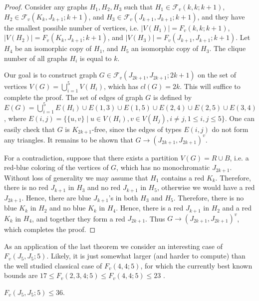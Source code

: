 \begin{proof}
Consider any graphs $H_1, H_2, H_3$ such that
$H_1 \in \mathcal{F}_v(k,k;k+1)$,
$H_2 \in \mathcal{F}_v(K_k,J_{k+1};k+1)$, and
$H_3 \in \mathcal{F}_v(J_{k+1},J_{k+1};k+1)$,
and they have the smallest possible number of vertices,
i.e. $|V(H_1)| = F_v(k,k;k+1)$,
$|V(H_2)| = F_v(K_k,J_{k+1};k+1)$, and
$|V(H_3)| = F_v(J_{k+1},J_{k+1};k+1)$.
Let $H_4$ be an isomorphic copy of $H_1$,
and $H_5$ an isomorphic copy of $H_3$.
The clique number of all graphs $H_i$ is
equal to $k$.

Our goal is to construct graph
$G \in \mathcal{F}_v(J_{2k+1},J_{2k+1};2k+1)$
on the set of vertices
$V(G)=\bigcup_{i=1}^5 V(H_i)$,
which has $cl(G)=2k$.
This will suffice to complete the proof.
The set of edges of graph $G$ is defined by
$E(G) = \bigcup_{i=1} ^5 E(H_i) \cup E(1,3)
\cup E(1,5) \cup E(2,4) \cup E(2,5) \cup E(3,4)$,
where
$E(i,j) = \{ \{ u,v\} \;|\; u \in V(H_i), v \in V(H_j),
i \not= j, 1 \le i,j \le 5\}$.
One can easily check that $G$ is $K_{2k+1}$-free,
since the edges of types $E(i,j)$ do not form
any triangles. It remains to be shown that
$G \rightarrow (J_{2k+1},J_{2k+1})^v$.

For a contradiction, suppose that there exists a partition
$V(G)=R \cup B$, i.e. a red-blue coloring of the vertices
of $G$, which has no monochromatic $J_{2k+1}$.
Without loss of generality we may assume that
$H_1$ contains a red $K_k$. Therefore, there is no red
$J_{k+1}$ in $H_3$ and no red $J_{k+1}$ in $H_5$,
otherwise we would have a red $J_{2k+1}$.
Hence, there are blue $J_{k+1}$'s in both
$H_3$ and $H_5$.
Therefore, there is no blue $K_k$ in $H_2$
and no blue $K_k$ in $H_4$.
Hence, there is a red $J_{k+1}$ in $H_2$
and a red $K_k$ in $H_4$, and together
they form a red $J_{2k+1}$.
Thus $G \rightarrow (J_{2k+1},J_{2k+1})^v$,
which completes the proof.
\end{proof}

\smallskip
As an application of the last theorem
we consider an interesting case of $F_v(J_5,J_5;5)$.
Likely, it is just somewhat larger (and harder to compute)
than the well studied classical case of
$F_v(4,4;5)$, for which the currently best
known bounds are
$17 \le F_v(2,3,4;5) \le F_v(4,4;5) \le 23$ \cite{Fv445}.

\begin{claim}
$F_v(J_5,J_5;5) \le 36$.
\end{claim}

